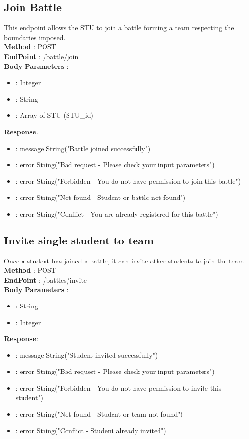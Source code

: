 \subsection*{Join Battle}
This endpoint allows the STU to join a battle forming a team respecting the boundaries imposed.\\
\textbf{Method} : POST \\
\textbf{EndPoint} : /battle/join \\
\textbf{Body Parameters} :
\begin{itemize}
    \item {} : Integer
    \item {} : String
    \item {} : Array of STU (STU\_id)
\end{itemize}
\textbf{Response}:
\begin{itemize}
    \item {} : message String("Battle joined successfully")
    \item {} : error String("Bad request - Please check your input parameters")
    \item {} : error String("Forbidden - You do not have permission to join this battle")
    \item {} : error String("Not found - Student or battle not found")
    \item {} : error String("Conflict - You are already registered for this battle")
\end{itemize}

\subsection*{Invite single student to team}
Once a student has joined a battle, it can invite other students to join the team.\\
\textbf{Method} : POST \\
\textbf{EndPoint} : /battles/invite \\
\textbf{Body Parameters} :
\begin{itemize}
    \item {} : String
    \item {} : Integer
\end{itemize}
\textbf{Response}:
\begin{itemize}
    \item {} : message String("Student invited successfully")
    \item {} : error String("Bad request - Please check your input parameters")
    \item {} : error String("Forbidden - You do not have permission to invite this student")
    \item {} : error String("Not found - Student or team not found")
    \item {} : error String("Conflict - Student already invited")
\end{itemize}
\newpage

